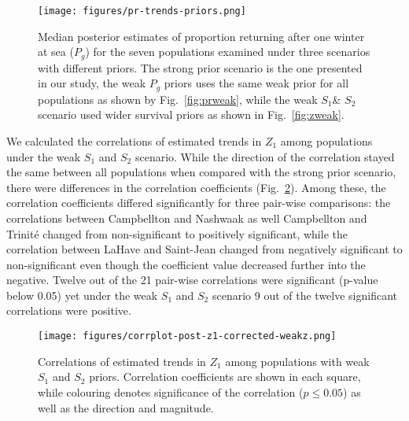 \documentclass[12pt]{article}
\newcommand{\So}{$S_{1}$\xspace}
\newcommand{\St}{$S_{2}$\xspace}
\newcommand{\Pg}{$P_g$\xspace}
\begin{document}
\begin{figure}[htbp] \centering
    \texttt{[image: figures/pr-trends-priors.png]}
    \caption{Median posterior estimates of proportion returning after one winter at sea 
        (\Pg) for the seven populations examined under three scenarios with
        different priors. The strong prior scenario is the one presented in
        our study, the weak \Pg priors uses the same weak prior for all
        populations as shown by Fig.~\ref{fig:prweak}, while the weak \So \&
        \St scenario used wider survival priors as shown in Fig.~\ref{fig:zweak}.} 
    \label{fig:pr-trends-priors} \end{figure}

We calculated the correlations of estimated trends in $Z_1$ among populations
under the weak \So and \St scenario. While the direction of the correlation
stayed the same between all populations when compared with the strong prior
scenario, there were differences in the correlation coefficients (Fig.~\ref{fig:s1-corr-weakz}).
Among these, the correlation coefficients differed significantly for three pair-wise
comparisons: the correlations between Campbellton and Nashwaak as well
Campbellton and Trinité changed from non-significant to positively
significant, while the correlation between LaHave and Saint-Jean changed from negatively significant to
non-significant even though the coefficient value decreased further into the
negative.
Twelve out of the 21 pair-wise correlations were significant (p-value below 0.05) yet under the  
weak \So and \St scenario 9 out of the twelve significant correlations were positive.

\begin{figure}[htbp] \centering
    \texttt{[image: figures/corrplot-post-z1-corrected-weakz.png]} \caption{
        Correlations of estimated trends in $Z_1$ among populations with weak \So and
\St priors. Correlation coefficients are shown in each square, while colouring
        denotes significance of the correlation ($p \leq 0.05$) as well as the direction and magnitude.}
\label{fig:s1-corr-weakz}
\end{figure}




\end{document}
